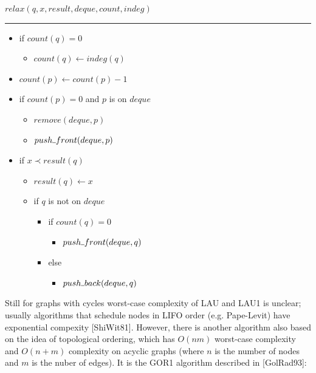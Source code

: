 \documentclass{article}
\newcommand{\Xset}{\!\leftarrow\!}
\newcommand{\Xund}{\rule{.4em}{.4pt}} %
\newcommand{\Xeq}{\!=\!}
\theoremstyle{definition}
\begin{document}
\begin{multicols}{2}
    $relax(q, x, result, deque, count, indeg)$
    \hrule
    \begin{itemize}[leftmargin=0in]
        \smallskip
        \item[] if $count(q) \Xeq 0$
        \begin{itemize}
            \item[] $count(q) \Xset indeg(q)$
        \end{itemize}
        \item[] $count(p) \Xset count(p) - 1$

        \item[] if $count(p) \Xeq 0$ and $p$ is on $deque$
        \begin{itemize}
            \item[] $remove (deque, p)$
            \item[] $push \Xund front (deque, p)$
        \end{itemize}

        \item[] if $x \prec result(q)$
        \begin{itemize}
            \item[] $result(q) \Xset x$
            \item[] if $q$ is not on $deque$
            \begin{itemize}
                \item[] if $count(q) \Xeq 0$
                \begin{itemize}
                    \item[] $push \Xund front (deque, q)$
                \end{itemize}
                \item[] else
                \begin{itemize}
                    \item[] $push \Xund back (deque, q)$
                \end{itemize}
            \end{itemize}
        \end{itemize}
    \end{itemize}

    \bigskip

Still for graphs with cycles worst-case complexity of LAU and LAU1 is unclear;
usually algorithms that schedule nodes in LIFO order (e.g. Pape-Levit) have exponential compexity [ShiWit81].
However, there is another algorithm also based on the idea of topological ordering,
which has $O(nm)$ worst-case complexity and $O(n + m)$ complexity on acyclic graphs
(where $n$ is the number of nodes and $m$ is the nuber of edges).
It is the GOR1 algorithm described in [GolRad93]:
\\


\end{multicols}
\end{document}

